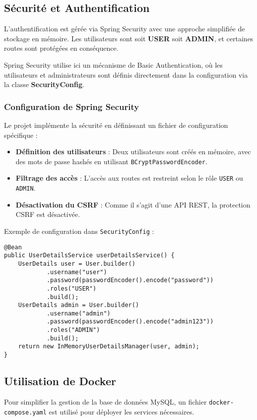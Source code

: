\documentclass{article}
\begin{document}
\subsection{Sécurité et Authentification}
L'authentification est gérée via Spring Security avec une approche simplifiée de stockage en mémoire.
Les utilisateurs sont soit \textbf{USER} soit \textbf{ADMIN}, et certaines routes sont protégées en conséquence.

Spring Security utilise ici un mécanisme de Basic Authentication, où les utilisateurs et administrateurs sont définis directement dans la configuration via la classe \textbf{SecurityConfig}.

\subsubsection{Configuration de Spring Security}
Le projet implémente la sécurité en définissant un fichier de configuration spécifique :
\begin{itemize}
    \item \textbf{Définition des utilisateurs} : Deux utilisateurs sont créés en mémoire, avec des mots de passe hashés en utilisant \texttt{BCryptPasswordEncoder}.
    \item \textbf{Filtrage des accès} : L'accès aux routes est restreint selon le rôle \texttt{USER} ou \texttt{ADMIN}.
    \item \textbf{Désactivation du CSRF} : Comme il s'agit d'une API REST, la protection CSRF est désactivée.
\end{itemize}

Exemple de configuration dans \texttt{SecurityConfig} :
\begin{verbatim}
@Bean
public UserDetailsService userDetailsService() {
    UserDetails user = User.builder()
            .username("user")
            .password(passwordEncoder().encode("password"))
            .roles("USER")
            .build();
    UserDetails admin = User.builder()
            .username("admin")
            .password(passwordEncoder().encode("admin123"))
            .roles("ADMIN")
            .build();
    return new InMemoryUserDetailsManager(user, admin);
}
\end{verbatim}

\subsection{Utilisation de Docker}
Pour simplifier la gestion de la base de données MySQL, un fichier \texttt{docker-compose.yaml} est utilisé pour déployer les services nécessaires.
\end{document}
